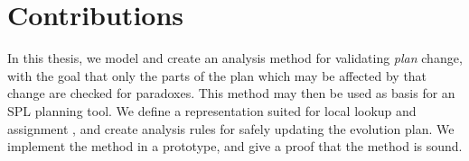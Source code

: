 
\section{Contributions}

In this thesis, we model and create an analysis method for validating \emph{plan} change, with the goal that only the parts of the plan which may be affected by that change are checked for paradoxes. This method may then be used as basis for an SPL planning tool. We define a representation suited for local lookup and assignment , and create analysis rules for safely updating the evolution plan. We implement the method in a prototype, and give a proof that the method is sound.

